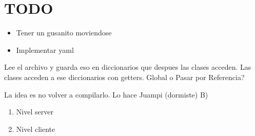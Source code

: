 \documentclass[11pt]{article}
\date{\today}
\title{}
\begin{document}
\tableofcontents

\section{TODO}
\label{sec:orgc85f66e}
\begin{itemize}
\item Tener un gusanito moviendose
\item Implementar yaml
\end{itemize}
Lee el archivo y guarda eso en diccionarios que despues las clases acceden.
Las clases acceden a ese diccionarios con getters.
Global o Pasar por Referencia?

La idea es no volver a compilarlo. Lo hace Juampi (dormiste) B)
\begin{enumerate}
\item Nivel server
\item Nivel cliente
\end{enumerate}
\end{document}
